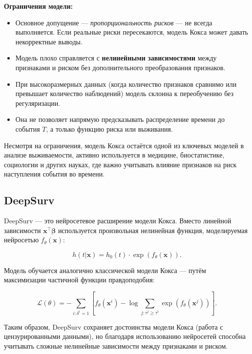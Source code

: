 \documentclass[a4paper,14pt,oneside,openany]{memoir}
\begin{document}
\vspace{1em}
\noindent
\textbf{Ограничения модели:}
\begin{itemize}
	\item Основное допущение — \textit{пропорциональность рисков} — не всегда выполняется. Если реальные риски пересекаются, модель Кокса может давать некорректные выводы.
	\item Модель плохо справляется с \textbf{нелинейными зависимостями} между признаками и риском без дополнительного преобразования признаков.
	\item При высокоразмерных данных (когда количество признаков сравнимо или превышает количество наблюдений) модель склонна к переобучению без регуляризации.
	\item Она не позволяет напрямую предсказывать распределение времени до события $T$, а только функцию риска или выживания.
\end{itemize}

\vspace{1em}
\noindent
Несмотря на ограничения, модель Кокса остаётся одной из ключевых моделей в анализе выживаемости, активно используется в медицине, биостатистике, социологии и других науках, где важно учитывать влияние признаков на риск наступления события во времени.


\subsection{DeepSurv}

DeepSurv \cite{Katzman2018} — это нейросетевое расширение модели Кокса. Вместо линейной зависимости $\mathbf{x}^\top \boldsymbol{\beta}$ используется произвольная нелинейная функция, моделируемая нейросетью $f_\theta(\mathbf{x})$:

\begin{equation}
	h(t|\mathbf{x}) = h_0(t) \cdot \exp(f_\theta(\mathbf{x})).
\end{equation}

Модель обучается аналогично классической модели Кокса — путём максимизации частичной функции правдоподобия:

\begin{equation}
	\mathcal{L}(\theta) = -\sum_{i:\delta^i=1} \left[ f_\theta(\mathbf{x}^i) - \log \sum_{j:\tau^j \geq \tau^i} \exp(f_\theta(\mathbf{x}^j)) \right].
\end{equation}

Таким образом, DeepSurv сохраняет достоинства модели Кокса (работа с цензурированными данными), но благодаря использованию нейросетей способна учитывать сложные нелинейные зависимости между признаками и риском.
\end{document}
